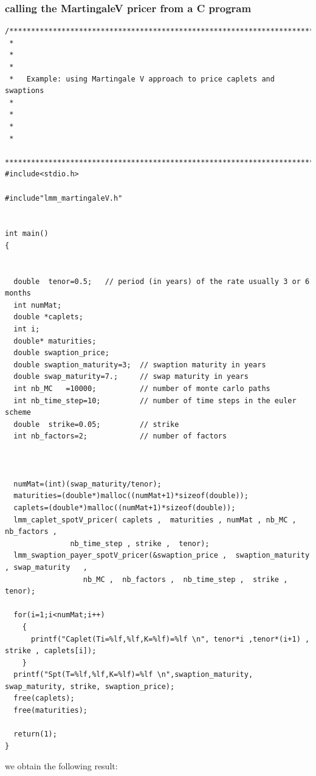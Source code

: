 \subsubsection{calling the MartingaleV pricer from a C program}

\small{

\begin{verbatim}
/**********************************************************************************************
 *
 *
 *
 *   Example: using Martingale V approach to price caplets and swaptions
 *
 *
 *
 *
 *********************************************************************************************/
#include<stdio.h>

#include"lmm_martingaleV.h"


int main()
{


  double  tenor=0.5;   // period (in years) of the rate usually 3 or 6 months
  int numMat;     
  double *caplets;
  int i;
  double* maturities;
  double swaption_price;
  double swaption_maturity=3;  // swaption maturity in years
  double swap_maturity=7.;     // swap maturity in years
  int nb_MC   =10000;          // number of monte carlo paths
  int nb_time_step=10;         // number of time steps in the euler scheme
  double  strike=0.05;         // strike 
  int nb_factors=2;            // number of factors

  
  
  numMat=(int)(swap_maturity/tenor);
  maturities=(double*)malloc((numMat+1)*sizeof(double));
  caplets=(double*)malloc((numMat+1)*sizeof(double));
  lmm_caplet_spotV_pricer( caplets ,  maturities , numMat , nb_MC , nb_factors , 
			   nb_time_step , strike ,  tenor);
  lmm_swaption_payer_spotV_pricer(&swaption_price ,  swaption_maturity , swap_maturity   , 
				  nb_MC ,  nb_factors ,  nb_time_step ,  strike , tenor);

  for(i=1;i<numMat;i++)
    {
      printf("Caplet(Ti=%lf,%lf,K=%lf)=%lf \n", tenor*i ,tenor*(i+1) , strike , caplets[i]);
    }
  printf("Spt(T=%lf,%lf,K=%lf)=%lf \n",swaption_maturity, swap_maturity, strike, swaption_price);
  free(caplets);
  free(maturities);

  return(1);
}

\end{verbatim}

}

we obtain the following result:

